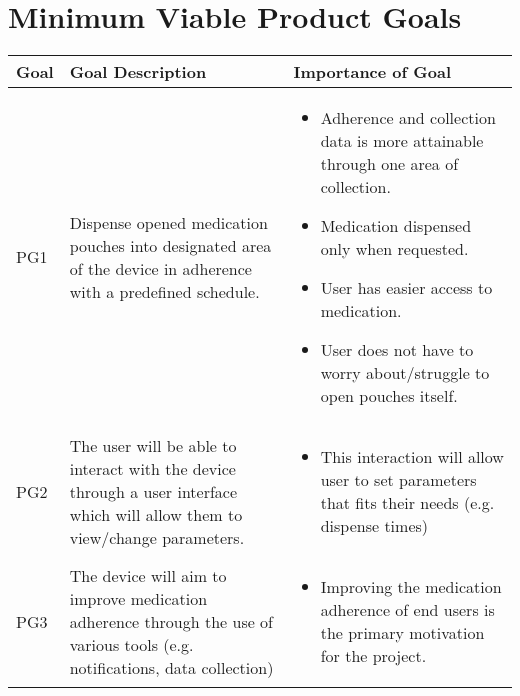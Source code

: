 \documentclass[12pt]{article}
\begin{document}
\section{Minimum Viable Product Goals}
\begin{center}
\begin{adjustbox}{max width=\textwidth}
\small
\begin{tabular}{|p{}|p{}|p{}|}
 \hline
 \textbf{Goal} & \textbf{Goal Description} & \textbf{Importance of Goal} \\ 
 \hline
 PG1 &
   Dispense opened medication pouches into designated area of the device in adherence with a predefined schedule. &
\begin{itemize}[noitemsep,topsep=0pt,leftmargin=13pt]
  \item Adherence and collection data is more attainable through one area of collection.
  \item Medication dispensed only when requested.
  \item User has easier access to medication.
  \item User does not have to worry about/struggle to open pouches itself.
  \end{itemize}\\ 
 \hline
 PG2 &
 The user will be able to interact with the device through a user interface which will allow them to view/change parameters. & 
\begin{itemize}[noitemsep,topsep=0pt,leftmargin=13pt]
  \item This interaction will allow user to set parameters that fits their needs (e.g. dispense times)
  \end{itemize}\\ 
 \hline
 PG3 &
The device will aim to improve medication adherence through the use of various tools (e.g. notifications, data collection)  & 
\begin{itemize}[noitemsep,topsep=0pt,leftmargin=13pt] 
  \item Improving the medication adherence of end users is the primary motivation for the project.
  \end{itemize}\\ 
 \hline
\end{tabular}
\end{adjustbox}
\end{center}

\pagebreak
\end{document}
